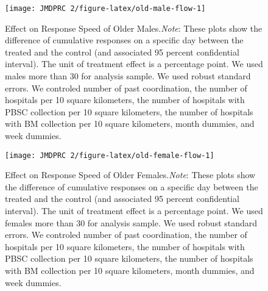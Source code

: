 \documentclass[12pt, a4paper]{article}
\begin{document}
\begin{figure}[H]
\texttt{[image: JMDPRC~2/figure-latex/old-male-flow-1]} \caption{Effect on Response Speed of Older Males.\newline \emph{Note}: These plots show the difference of cumulative responses on a specific day between the treated and the control (and associated 95 percent confidential interval). The unit of treatment effect is a percentage point. We used males more than 30 for analysis sample. We used robust standard errors. We controled number of past coordination, the number of hospitals per 10 square kilometers, the number of hospitals with PBSC collection per 10 square kilometers, the number of hospitals with BM collection per 10 square kilometers, month dummies, and week dummies.}\label{fig:old-male-flow}
\end{figure}

\begin{figure}[H]
\texttt{[image: JMDPRC~2/figure-latex/old-female-flow-1]} \caption{Effect on Response Speed of Older Females.\newline \emph{Note}: These plots show the difference of cumulative responses on a specific day between the treated and the control (and associated 95 percent confidential interval). The unit of treatment effect is a percentage point. We used females more than 30 for analysis sample. We used robust standard errors. We controled number of past coordination, the number of hospitals per 10 square kilometers, the number of hospitals with PBSC collection per 10 square kilometers, the number of hospitals with BM collection per 10 square kilometers, month dummies, and week dummies.}\label{fig:old-female-flow}
\end{figure}
\end{document}
